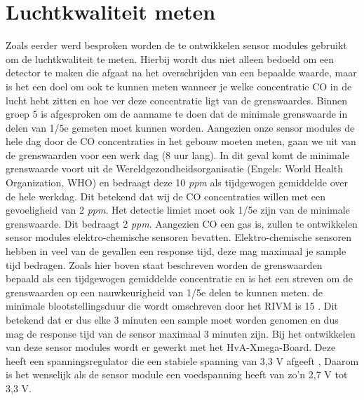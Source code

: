 \documentclass[a4paper, 11pt]{article} %
\begin{document}
\section{Luchtkwaliteit meten}
Zoals eerder werd besproken worden de te ontwikkelen sensor modules gebruikt om de luchtkwaliteit te meten. Hierbij wordt dus niet alleen bedoeld om een detector te maken die afgaat na het overschrijden van een bepaalde waarde, maar is het een doel om ook te kunnen meten wanneer je welke concentratie CO in de lucht hebt zitten en hoe ver deze concentratie ligt van de grenswaardes. Binnen groep 5 is afgesproken om de aanname te doen dat de minimale grenswaarde in delen van 1/5e gemeten moet kunnen worden. Aangezien onze sensor modules de hele dag door de CO concentraties in het gebouw moeten meten, gaan we uit van de grenswaarden voor een werk dag (8 uur lang). In dit geval komt de minimale grenswaarde voort uit de Wereldgezondheidsorganisatie (Engels: World Health Organization, WHO) en bedraagt deze 10 \textit{ppm} als tijdgewogen gemiddelde over de hele werkdag. Dit betekend dat wij de CO concentraties willen met een gevoeligheid van 2 \textit{ppm}. Het detectie limiet moet ook 1/5e zijn van de minimale grenswaarde. Dit bedraagt 2 \textit{ppm}. Aangezien CO een gas is, zullen te ontwikkelen sensor modules elektro-chemische sensoren bevatten. Elektro-chemische sensoren hebben in veel van de gevallen een response tijd, deze mag maximaal je sample tijd bedragen. Zoals hier boven staat beschreven worden de grenswaarden bepaald als een tijdgewogen gemiddelde concentratie en is het een streven om de grenswaarden op een nauwkeurigheid van 1/5e delen te kunnen meten. de minimale blootstellingsduur die wordt omschreven door het RIVM is 15 \cite{Blootstelling aan CO}. Dit betekend dat er dus elke 3 minuten een sample moet worden genomen en dus mag de response tijd van de sensor maximaal 3 minuten zijn. Bij het ontwikkelen van deze sensor modules wordt er gewerkt met het HvA-Xmega-Board. Deze heeft een spanningsregulator die een stabiele spanning van 3,3 V afgeeft \cite{xmega}, Daarom is het wenselijk als de sensor module een voedspanning heeft van zo'n 2,7 V tot 3,3 V.
\end{document}

